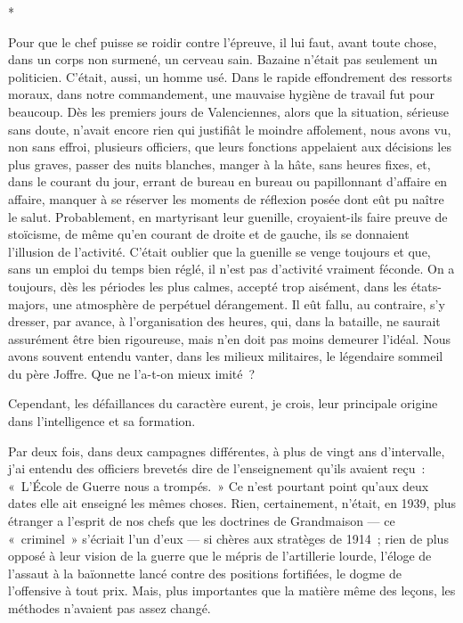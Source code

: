 \documentclass[french,twoside]{book} %
\begin{document}
\begin{center}
*\end{center}
\noindent Pour que le chef puisse se roidir contre l’épreuve, il lui faut, avant toute chose, dans un corps non surmené, un cerveau sain. Bazaine n’était pas seulement un politicien. C’était, aussi, un homme usé. Dans le rapide effondrement des ressorts moraux, dans notre commandement, une mauvaise hygiène de travail fut pour beaucoup. Dès les premiers jours de Valenciennes, alors que la situation, sérieuse sans doute, n’avait encore rien qui justifiât le moindre affolement, nous avons vu, non sans effroi, plusieurs officiers, que leurs fonctions appelaient aux décisions les plus graves, passer des nuits blanches, manger à la hâte, sans heures fixes, et, dans le   courant du jour, errant de bureau en bureau ou papillonnant d’affaire en affaire, manquer à se réserver les moments de réflexion posée dont eût pu naître le salut. Probablement, en martyrisant leur guenille, croyaient-ils faire preuve de stoïcisme, de même qu’en courant de droite et de gauche, ils se donnaient l’illusion de l’activité. C’était oublier que la guenille se venge toujours et que, sans un emploi du temps bien réglé, il n’est pas d’activité vraiment féconde. On a toujours, dès les périodes les plus calmes, accepté trop aisément, dans les états-majors, une atmosphère de perpétuel dérangement. Il eût fallu, au contraire, s’y dresser, par avance, à l’organisation des heures, qui, dans la bataille, ne saurait assurément être bien rigoureuse, mais n’en doit pas moins demeurer l’idéal. Nous avons souvent entendu vanter, dans les milieux militaires, le légendaire sommeil du père Joffre. Que ne l’a-t-on mieux imité ?\par
Cependant, les défaillances du caractère eurent, je crois, leur principale origine dans l’intelligence et sa formation.\par
Par deux fois, dans deux campagnes différentes, à plus de vingt ans d’intervalle, j’ai entendu des officiers brevetés dire de l’enseignement qu’ils avaient reçu : « L’École de Guerre nous a trompés. » Ce n’est pourtant point qu’aux deux dates elle ait enseigné les mêmes choses. Rien, certainement, n’était, en 1939, plus étranger a l’esprit de nos chefs que les doctrines de Grandmaison — ce « criminel » s’écriait l’un d’eux — si chères aux stratèges de 1914 ; rien de plus opposé à leur vision de la guerre que le mépris de l’artillerie lourde, l’éloge de l’assaut à la baïonnette lancé contre des positions fortifiées, le dogme de l’offensive à tout prix. Mais, plus importantes que la matière même des leçons, les méthodes n’avaient pas assez changé.\par
\end{document}
